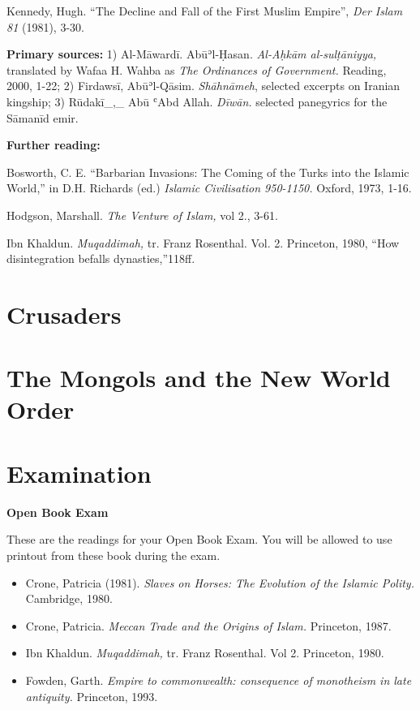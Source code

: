\documentclass[
]{book}
\begin{document}
Kennedy, Hugh. ``The Decline and Fall of the First Muslim Empire'', \emph{Der Islam 81} (1981), 3-30.

\textbf{Primary sources:} 1) Al-Māwardī. Abūʾl-Ḥasan. \emph{Al-Aḥkām al-sulṭāniyya,} translated by Wafaa H. Wahba as \emph{The Ordinances of Government.} Reading, 2000, 1-22; 2) Firdawsī, Abūʾl-Qāsim. \emph{Shāhnāmeh},
selected excerpts on Iranian kingship; 3) Rūdakī\_,\_ Abū ʿAbd Allah.
\emph{Dīwān.} selected panegyrics for the Sāmanīd emir.

\textbf{Further reading:}

Bosworth, C. E. ``Barbarian Invasions: The Coming of the Turks into the
Islamic World,'' in D.H. Richards (ed.) \emph{Islamic Civilisation 950-1150.}
Oxford, 1973, 1-16.

Hodgson, Marshall. \emph{The Venture of Islam,} vol 2., 3-61.

Ibn Khaldun. \emph{Muqaddimah,} tr. Franz Rosenthal. Vol. 2. Princeton, 1980,
``How disintegration befalls dynasties,''118ff.

\hypertarget{crusaders}{%
\chapter{Crusaders}\label{crusaders}}

\hypertarget{the-mongols-and-the-new-world-order}{%
\chapter{The Mongols and the New World Order}\label{the-mongols-and-the-new-world-order}}

\hypertarget{examination}{%
\chapter*{Examination}\label{examination}}

\textbf{Open Book Exam}

These are the readings for your Open Book Exam. You will be allowed to use printout from these book during the exam.

\begin{itemize}
\item
  Crone, Patricia (1981). \emph{Slaves on Horses: The Evolution of the Islamic Polity.} Cambridge, 1980.
\item
  Crone, Patricia. \emph{Meccan Trade and the Origins of Islam.} Princeton, 1987.
\item
  Ibn Khaldun. \emph{Muqaddimah,} tr. Franz Rosenthal. Vol 2. Princeton, 1980.
\item
  Fowden, Garth. \emph{Empire to commonwealth: consequence of monotheism in late antiquity.} Princeton, 1993.
\end{itemize}
\end{document}
